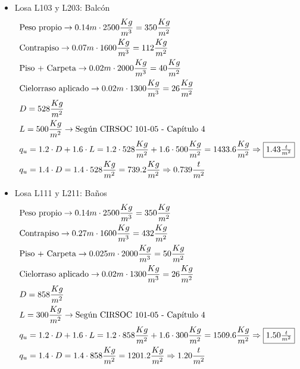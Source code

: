 \begin{enumerate}
\begin{itemize}
\item Losa L103 y L203: Balcón
\begin{align*}
& \text{Peso propio} \rightarrow 0.14m \cdot 2500 \frac{Kg}{m^3} = 350 \frac{Kg}{m^2}\\
& \text{Contrapiso} \rightarrow 0.07m \cdot 1600 \frac{Kg}{m^3} = 112 \frac{Kg}{m^2}\\
& \text{Piso + Carpeta} \rightarrow 0.02m \cdot 2000 \frac{Kg}{m^3} = 40 \frac{Kg}{m^2}\\
& \text{Cielorraso aplicado} \rightarrow  0.02m \cdot 1300 \frac{Kg}{m^3} = 26 \frac{Kg}{m^2}\\
& D = 528 \frac{Kg}{m^2}\\
& L = 500 \frac{Kg}{m^2} \rightarrow \text{Según CIRSOC 101-05 - Capítulo 4}\\
& q_u = 1.2 \cdot D + 1.6 \cdot L = 1.2 \cdot 528 \frac{Kg}{m^2} + 1.6 \cdot 500 \frac{Kg}{m^2} = 1433.6 \frac{Kg}{m^2} \Rightarrow \framebox{$1.43 \frac{t}{m^2}$} \\
& q_u = 1.4 \cdot D = 1.4 \cdot 528 \frac{Kg}{m^2} = 739.2 \frac{Kg}{m^2} \Rightarrow 0.739 \frac{t}{m^2}
\end{align*}

\item Losa L111 y L211: Baños
\begin{align*}
& \text{Peso propio} \rightarrow 0.14m \cdot 2500 \frac{Kg}{m^3} = 350 \frac{Kg}{m^2}\\
& \text{Contrapiso} \rightarrow 0.27m \cdot 1600 \frac{Kg}{m^3} = 432 \frac{Kg}{m^2}\\
& \text{Piso + Carpeta} \rightarrow 0.025m \cdot 2000 \frac{Kg}{m^3} = 50 \frac{Kg}{m^2}\\
& \text{Cielorraso aplicado} \rightarrow  0.02m \cdot 1300 \frac{Kg}{m^3} = 26 \frac{Kg}{m^2}\\
& D = 858 \frac{Kg}{m^2}\\
& L = 300 \frac{Kg}{m^2} \rightarrow \text{Según CIRSOC 101-05 - Capítulo 4}\\
& q_u = 1.2 \cdot D + 1.6 \cdot L = 1.2 \cdot 858 \frac{Kg}{m^2} + 1.6 \cdot 300 \frac{Kg}{m^2} = 1509.6 \frac{Kg}{m^2} \Rightarrow \framebox{$1.50 \frac{t}{m^2}$}\\
& q_u = 1.4 \cdot D = 1.4 \cdot 858 \frac{Kg}{m^2} = 1201.2 \frac{Kg}{m^2} \Rightarrow 1.20 \frac{t}{m^2}
\end{align*}


\end{itemize}
\end{enumerate}
